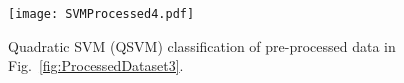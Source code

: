 \documentclass[letterpaper, 10 pt, conference]{ieeeconf}
\begin{document}
\begin{figure}[h!]
\centering
\captionsetup{justification=centering}
\texttt{[image: SVMProcessed4.pdf]}
\caption{Quadratic SVM (QSVM) classification of pre-processed data in Fig.~\ref{fig:ProcessedDataset3}.}
\label{fig:SVMProcessed4}
\end{figure}

%





\end{document}
